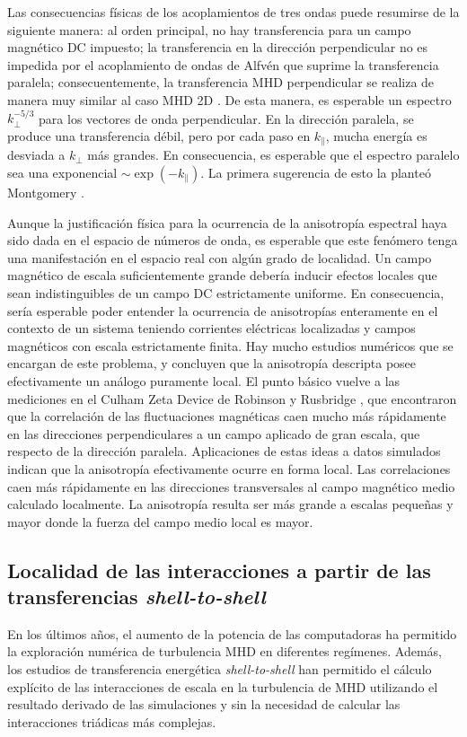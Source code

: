 Las consecuencias físicas de los acoplamientos de tres ondas puede
resumirse de la siguiente manera: al orden principal, no hay
transferencia para un campo magnético DC impuesto; la transferencia en
la dirección perpendicular no es impedida por el acoplamiento de ondas
de Alfv\'en que suprime la transferencia paralela; consecuentemente,
la transferencia MHD perpendicular se realiza de manera muy similar al
caso MHD 2D \cite{fyfe_dissipative_1977}. De esta manera, es esperable
un espectro $k_\perp^{-5/3}$ para los vectores de onda
perpendicular. En la dirección paralela, se produce una transferencia
débil, pero por cada paso en $k_\parallel$, mucha energía es desviada
a $k_\perp$ más grandes. En consecuencia, es esperable que el espectro
paralelo sea una exponencial $\sim \exp(-k_\parallel)$. La primera
sugerencia de esto la planteó Montgomery
\cite{montgomery_density_1987}.

Aunque la justificación física para la ocurrencia de la anisotropía
espectral haya sido dada en el espacio de números de onda, es
esperable que este fenómero tenga una manifestación en el espacio real
con algún grado de localidad. Un campo magnético de escala
suficientemente grande debería inducir efectos locales que sean
indistinguibles de un campo DC estrictamente uniforme. En
consecuencia, sería esperable poder entender la ocurrencia de
anisotropías enteramente en el contexto de un sistema teniendo
corrientes eléctricas localizadas y campos magnéticos con escala
estrictamente finita. Hay mucho estudios numéricos
\cite{cho_anisotropy_2000, milano_local_2001} que se encargan de este
problema, y concluyen que la anisotropía descripta posee efectivamente
un análogo puramente local. El punto básico vuelve a las mediciones en
el Culham Zeta Device de Robinson y Rusbridge
\cite{robinson_structure_1971}, que encontraron que la correlación de
las fluctuaciones magnéticas caen mucho más rápidamente en las
direcciones perpendiculares a un campo aplicado de gran escala, que
respecto de la dirección paralela. Aplicaciones de estas ideas a datos
simulados indican que la anisotropía efectivamente ocurre en forma
local. Las correlaciones caen más rápidamente en las direcciones
transversales al campo magnético medio calculado localmente. La
anisotropía resulta ser más grande a escalas pequeñas
\cite{cho_anisotropy_2000} y mayor donde la fuerza del campo medio
local es mayor.



\subsection{Localidad de las interacciones a partir de las transferencias \emph{shell-to-shell}}
En los últimos años, el aumento de la potencia de las computadoras ha
permitido la exploración numérica de turbulencia MHD en diferentes
regímenes. Además, los estudios de transferencia energética
\textit{shell-to-shell} \cite{alexakis_shell_2005, dar_energy_2001,
  debliquy_energy_2005} han permitido el cálculo explícito de las
interacciones de escala en la turbulencia de MHD utilizando el
resultado derivado de las simulaciones y sin la necesidad de calcular
las interacciones triádicas más complejas.

